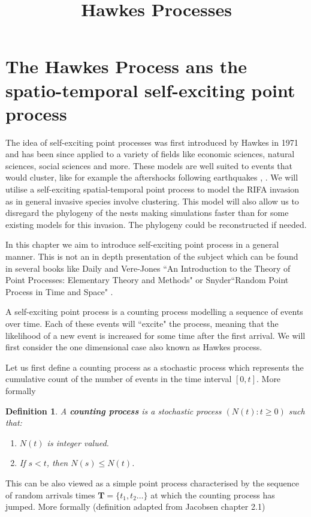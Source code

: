 \documentclass[11pt,a4paper]{article}
\title{Hawkes Processes}
\renewcommand{\vec}[1]{\mathbf{#1}}
\newtheorem{definition}{Definition}[section]
\begin{document}
\section{The Hawkes Process ans the spatio-temporal self-exciting point process}

The idea of self-exciting point processes was first introduced by Hawkes in 1971 \cite{Hawkes71} and has been since applied to a variety of fields like economic sciences, natural sciences, social sciences and more. These models are well suited to events that would cluster, like for example the aftershocks following earthquakes \cite{Ogata88}, \cite{Mohler}. We will utilise a self-exciting spatial-temporal point process to model the RIFA invasion as in general invasive species involve clustering. This model will also allow us to disregard the phylogeny of the nests making simulations faster than for some existing models for this invasion. The phylogeny could be reconstructed if needed.

In this chapter we aim to introduce self-exciting point process in a general manner. This is not an in depth presentation of the subject which can be found in several books like Daily and Vere-Jones ``An Introduction to the Theory of Point Processes: Elementary Theory and Methods" \cite{Daley} or Snyder``Random Point Process in Time and Space" \cite{Snyder}.

A self-exciting point process is a counting process modelling a sequence of events over time. Each of these events will ``excite" the process, meaning that the likelihood of a new event is increased for some time after the first arrival. We will first consider the one dimensional case also known as Hawkes process.

Let us first define a counting process as a stochastic process which represents the cumulative count of the number of events in the time interval $[0, t]$. More formally

\begin{definition}
    A \textbf{counting process} is a stochastic process $(N(t) : t \geq 0)$ such that:
    \begin{enumerate}[label=(\roman*)]
        \item $N(t)$ is integer valued.
        \item If $s<t$, then $N(s) \leq N(t)$.
    \end{enumerate}
\end{definition}

This can be also viewed as a simple point process characterised by the sequence of random arrivals times $\vec{T} = \{ t_1, t_2 \dots \}$ at which the counting process has jumped. More formally (definition adapted from Jacobsen \cite{Jacobsen} chapter 2.1)
\end{document}

